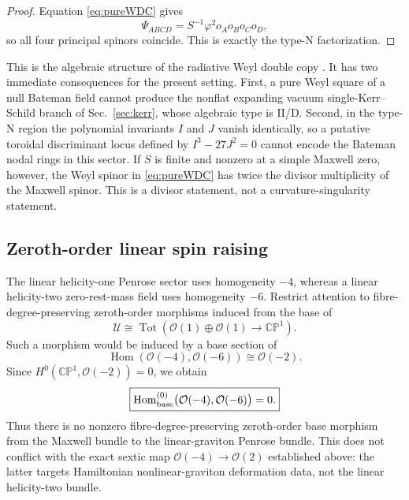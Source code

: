 \documentclass[aps,prd,reprint,nofootinbib,superscriptaddress]{revtex4-2}
\theoremstyle{definition}
\theoremstyle{remark}
\newcommand{\CP}{\mathbb{CP}}
\begin{document}
\begin{proof}
Equation \eqref{eq:pureWDC} gives
\begin{equation}
 \Psi_{ABCD}=S^{-1}\varphi^2o_Ao_Bo_Co_D,
\end{equation}
so all four principal spinors coincide.  This is exactly the type-N factorization.
\end{proof}

This is the algebraic structure of the radiative Weyl double copy \cite{Godazgar2021}.  It has two immediate consequences for the present setting.  First, a pure Weyl square of a null Bateman field cannot produce the nonflat expanding vacuum single-Kerr--Schild branch of Sec.~\ref{sec:kerr}, whose algebraic type is II/D.  Second, in the type-N region the polynomial invariants $I$ and $J$ vanish identically, so a putative toroidal discriminant locus defined by $I^3-27J^2=0$ cannot encode the Bateman nodal rings in this sector.  If $S$ is finite and nonzero at a simple Maxwell zero, however, the Weyl spinor in \eqref{eq:pureWDC} has twice the divisor multiplicity of the Maxwell spinor.  This is a divisor statement, not a curvature-singularity statement.

\subsection{Zeroth-order linear spin raising}

The linear helicity-one Penrose sector uses homogeneity $-4$, whereas a linear helicity-two zero-rest-mass field uses homogeneity $-6$.  Restrict attention to fibre-degree-preserving zeroth-order morphisms induced from the base of
\begin{equation}
 \mathcal U\cong\operatorname{Tot}\left(\mathcal O(1)\oplus\mathcal O(1)\to\CP^1\right).
\end{equation}
Such a morphism would be induced by a base section of
\begin{equation}
 \operatorname{Hom}(\mathcal O(-4),\mathcal O(-6))
 \cong\mathcal O(-2).
\end{equation}
Since $H^0(\CP^1,\mathcal O(-2))=0$, we obtain
\begin{equation}
 \boxed{\operatorname{Hom}^{(0)}_{\rm base}\bigl(\mathcal O(-4),\mathcal O(-6)\bigr)=0.}
 \label{eq:SpinRaiseNoGo}
\end{equation}
Thus there is no nonzero fibre-degree-preserving zeroth-order base morphism from the Maxwell bundle to the linear-graviton Penrose bundle.  This does not conflict with the exact sextic map $\mathcal O(-4)\to\mathcal O(2)$ established above: the latter targets Hamiltonian nonlinear-graviton deformation data, not the linear helicity-two bundle.
\end{document}
